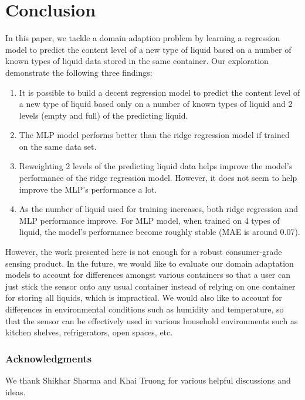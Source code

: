 \documentclass{article} %
\begin{document}
\section{Conclusion}
In this paper, we tackle a domain adaption problem by learning a regression model to predict the content level of a new type of liquid based on a number of known types of liquid data stored in the same container. Our exploration demonstrate the following three findings: 
\begin{enumerate}
\item It is possible to build a decent regression model to predict the content level of a new type of liquid based only on a number of known types of liquid and 2 levels (empty and full) of the predicting liquid.

\item The MLP model performs better than the ridge regression model if trained on the same data set.

\item Reweighting 2 levels of the predicting liquid data helps improve the model's performance of the ridge regression model. However, it does not seem to help improve the MLP's performance a lot.

\item As the number of liquid used for training increases, both ridge regression and MLP performance improve. For MLP model, when trained on 4 types of liquid, the model's performance become roughly stable (MAE is around 0.07).
\end{enumerate}

However, the work presented here is not enough for a robust consumer-grade sensing product. In the future, we would like to evaluate our domain adaptation models to account for differences amongst various containers so that a user can just stick the sensor onto any usual container instead of relying on one container for storing all liquids, which is impractical. We would also like to account for differences in environmental conditions such as humidity and temperature, so that the sensor can be effectively used in various household environments such as kitchen shelves, refrigerators, open spaces, etc.

\subsubsection*{Acknowledgments}
We thank Shikhar Sharma and Khai Truong for various helpful discussions and ideas.




\end{document}
